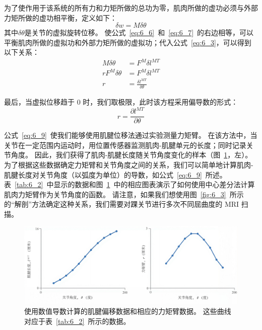 为了使作用于该系统的所有力和力矩所做的总功为零，肌肉所做的虚功必须与外部力矩所做的虚功相平衡，定义如下：
%
\begin{equation}
	\delta w = M \delta \theta
	\label{eq:6_7}
\end{equation}
%
其中$\delta \theta$是关节的虚拟旋转位移。
使公式~\ref{eq:6_6}~和~\ref{eq:6_7}~的右边相等，可以平衡肌肉所做的虚拟功和外部力矩所做的虚拟功；代入公式~\ref{eq:6_3}，可以得到以下关系：
%
\begin{equation}
	\begin{aligned}
		M \delta \theta & = F^M \delta l^{MT} \\
		r F^M \delta \theta & = F^M \delta l^{MT} \\
		r & = \frac{\delta l^{MT}}{\delta \theta}
	\end{aligned}
	\label{eq:6_8}
\end{equation}


最后，当虚拟位移趋于 0 时，我们取极限，此时该方程采用偏导数的形式：
%
\begin{equation}
	r = \frac{\partial l^{MT}}{\partial \theta}
	\label{eq:6_9}
\end{equation}

公式~\ref{eq:6_9}~使我们能够使用肌腱位移法通过实验测量力矩臂。
在该方法中，当关节在一定范围内运动时，用位置传感器监测肌肉-肌腱单元的长度；同时记录关节角度。
因此，我们获得了肌肉-肌腱长度随关节角度变化的样本（图~\ref{fig:6_5}，左）。
为了根据这些数据确定力矩臂和关节角度之间的关系，我们可以简单地计算肌肉-肌腱长度对关节角度（以弧度为单位）的导数，如公式~\ref{eq:6_9}~所述。
表~\ref{tab:6_2}~中显示的数据和图~\ref{fig:6_5}~中的相应图表演示了如何使用中心差分法计算肌肉力矩臂作为关节角度的函数。
请注意，如果我们想使用图~\ref{fig:6_3}~所示的“解剖”方法确定这种关系，我们需要对踝关节进行多次不同屈曲度的 MRI 扫描。


\begin{figure}[!htb]
	\centering
	\includegraphics[width=1.0\linewidth]{chap6/6_5}
	\caption{使用数值导数计算的肌腱偏移数据和相应的力矩臂数据。
		这些曲线对应于表~\ref{tab:6_2}~所示的数据。 \label{fig:6_5}}
\end{figure}


